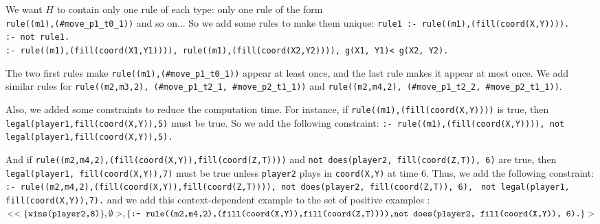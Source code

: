 \documentclass[12pt,twoside]{report}
\begin{document}
\bigskip

We want $H$ to contain only one rule of each type: only one rule of the form\\ \texttt{rule((m1),(\#move\_p1\_t0\_1))} and so on... 
So we add some rules to make them unique:\newline
\texttt{rule1 :- rule((m1),(fill(coord(X,Y)))).}\\
\texttt{:- not rule1.}\\
\texttt{:- rule((m1),(fill(coord(X1,Y1)))), rule((m1),(fill(coord(X2,Y2)))), g(X1, Y1)< g(X2, Y2). }\\

\smallskip

The two first rules make \texttt{rule((m1),(\#move\_p1\_t0\_1))} appear at least once, and the last rule makes it appear at most once. We add similar rules for \texttt{rule((m2,m3,2), (\#move\_p1\_t2\_1, \#move\_p2\_t1\_1))} and \texttt{rule((m2,m4,2), (\#move\_p1\_t2\_2, \#move\_p2\_t1\_1))}.

\bigskip

Also, we added some constraints to reduce the computation time. For instance, if \texttt{rule((m1),(fill(coord(X,Y))))} is true, then \texttt{legal(player1,fill(coord(X,Y)),5)} must be true. So we add the following constraint:\newline
\texttt{:- rule((m1),(fill(coord(X,Y)))), not legal(player1,fill(coord(X,Y)),5).}

\bigskip

And if \texttt{rule((m2,m4,2),(fill(coord(X,Y)),fill(coord(Z,T))))} and \texttt{not does(player2, fill(coord(Z,T)), 6)} are true, then \texttt{legal(player1, fill(coord(X,Y)),7)} must be true unless \texttt{player2} plays in \texttt{coord(X,Y)} at time 6. Thus, we add the following constraint:\newline
\texttt{:- rule((m2,m4,2),(fill(coord(X,Y)),fill(coord(Z,T)))), not does(player2, fill(coord(Z,T)), 6),}
\texttt{ not legal(player1, fill(coord(X,Y)),7).}\newline
and we add this context-dependent example to the set of positive examples : \newline
$<<\{\texttt{wins(player2,8)}\},\emptyset>,\\ \{\texttt{:- rule((m2,m4,2),(fill(coord(X,Y)),fill(coord(Z,T)))),} \\ \texttt{not does(player2, fill(coord(X,Y)), 6).}\}>$

\smallskip
\end{document}
